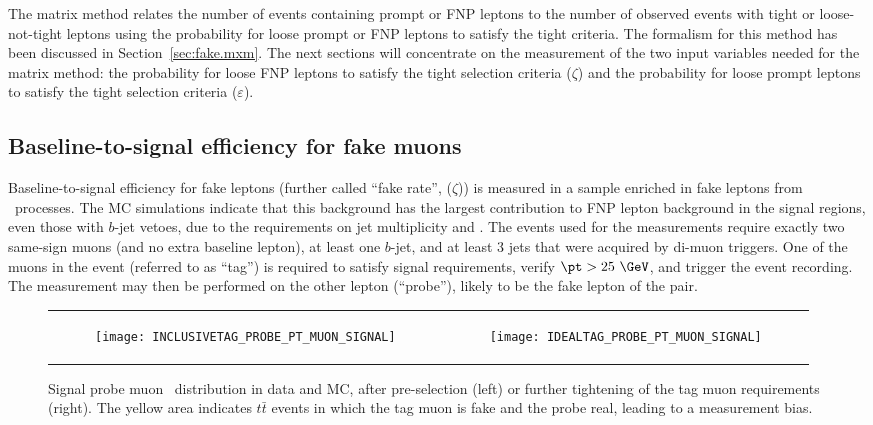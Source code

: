 The matrix method relates the number of events containing prompt or FNP leptons 
to the number of observed events with tight or loose-not-tight leptons 
using the probability for loose prompt or FNP leptons to satisfy the tight criteria.
The formalism for this method has been discussed in Section~\ref{sec:fake.mxm}.
The next sections will concentrate on the measurement of the 
two input variables needed for the matrix method:
the probability for loose FNP leptons to satisfy the tight selection
criteria ($\zeta$) and 
the probability for loose prompt leptons to satisfy the tight selection 
criteria ($\varepsilon$).

\subsection*{Baseline-to-signal efficiency for fake muons}

Baseline-to-signal efficiency for fake leptons (further called ``fake rate'', ($\zeta$)) is measured 
in a sample enriched in fake leptons from \ttbar\ processes.
The MC simulations indicate that this background has the largest contribution to FNP lepton background in the signal regions, 
even those with $b$-jet vetoes, due to the requirements on jet multiplicity and \met. 
The events used for the measurements require exactly two same-sign muons (and no extra baseline lepton), 
at least one $b$-jet, and at least 3 jets that were acquired by di-muon triggers.
One of the muons in the event (referred to as ``tag'') is required to satisfy signal requirements, verify $\pt>25~\GeV$, 
and trigger the event recording. 
The measurement may then be performed on the other lepton (``probe''), likely to be the fake lepton of the pair. 

\begin{figure}[htb!]
\centering
\begin{tabular}{rr}
\begin{subfigure}[t]{0.5\textwidth}\texttt{[image: INCLUSIVETAG\_PROBE\_PT\_MUON\_SIGNAL]}\caption{}\label{fig:bkg.mxm.INCLUSIVETAG_PROBE_PT_MUON_SIGNAL}\end{subfigure}&
\begin{subfigure}[t]{0.5\textwidth}\texttt{[image: IDEALTAG\_PROBE\_PT\_MUON\_SIGNAL]}\caption{}\label{fig:bkg.mxm.IDEALTAG_PROBE_PT_MUON_SIGNAL}\end{subfigure} \\
\end{tabular}
\caption
{Signal probe muon \pt\ distribution in data and MC, after pre-selection (left) 
or further tightening of the tag muon requirements (right).
The yellow area indicates $t\bar t$ events in which the tag muon is fake and the probe real, 
leading to a measurement bias. 
}
\label{Figurefakes_preselection_muon}
\end{figure}

